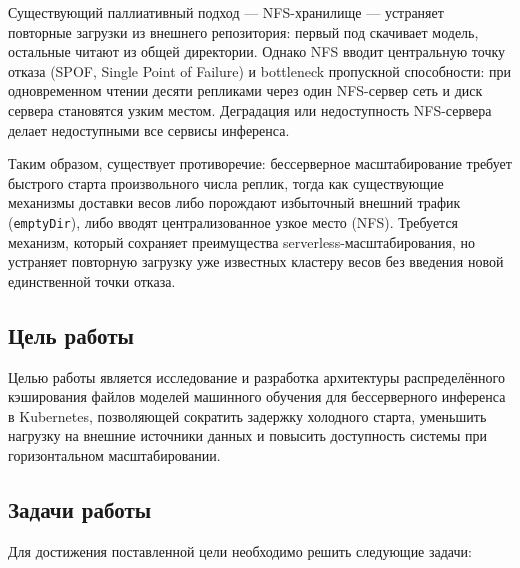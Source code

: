Существующий паллиативный подход --- NFS-хранилище --- устраняет повторные загрузки из внешнего репозитория: первый под скачивает модель, остальные читают из общей директории. Однако NFS вводит центральную точку отказа (SPOF, Single Point of Failure) и bottleneck пропускной способности: при одновременном чтении десяти репликами через один NFS-сервер сеть и диск сервера становятся узким местом. Деградация или недоступность NFS-сервера делает недоступными все сервисы инференса.

Таким образом, существует противоречие: бессерверное масштабирование требует быстрого старта произвольного числа реплик, тогда как существующие механизмы доставки весов либо порождают избыточный внешний трафик (\texttt{emptyDir}), либо вводят централизованное узкое место (NFS). Требуется механизм, который сохраняет преимущества serverless-масштабирования, но устраняет повторную загрузку уже известных кластеру весов без введения новой единственной точки отказа.

\subsection*{Цель работы}

Целью работы является исследование и разработка архитектуры распределённого кэширования файлов моделей машинного обучения для бессерверного инференса в Kubernetes, позволяющей сократить задержку холодного старта, уменьшить нагрузку на внешние источники данных и повысить доступность системы при горизонтальном масштабировании.

\subsection*{Задачи работы}

Для достижения поставленной цели необходимо решить следующие задачи:

